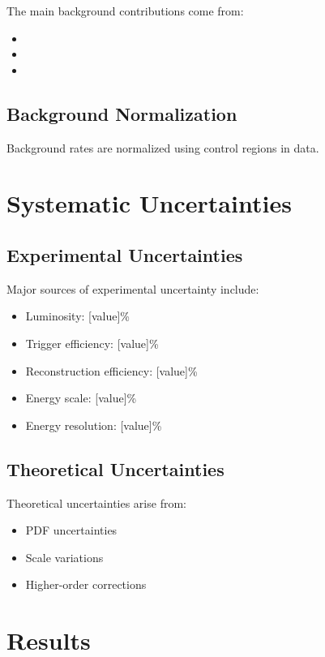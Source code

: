 The main background contributions come from:
\begin{itemize}
  \item [Background process 1]
  \item [Background process 2]
  \item [Background process 3]
\end{itemize}

\subsection{Background Normalization}

Background rates are normalized using control regions in data.

\section{Systematic Uncertainties}

\subsection{Experimental Uncertainties}

Major sources of experimental uncertainty include:
\begin{itemize}
  \item Luminosity: [value]\%
  \item Trigger efficiency: [value]\%
  \item Reconstruction efficiency: [value]\%
  \item Energy scale: [value]\%
  \item Energy resolution: [value]\%
\end{itemize}

\subsection{Theoretical Uncertainties}

Theoretical uncertainties arise from:
\begin{itemize}
  \item PDF uncertainties
  \item Scale variations
  \item Higher-order corrections
\end{itemize}

\section{Results}

